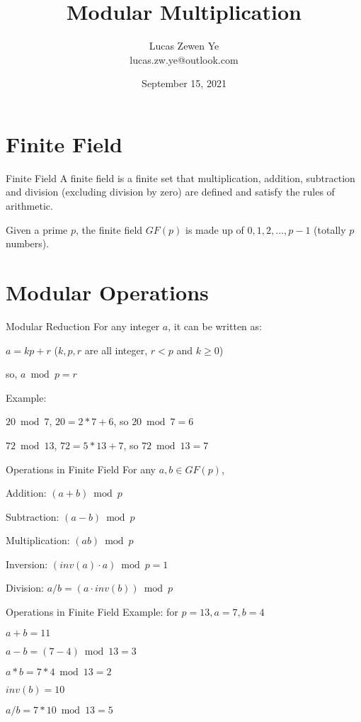 \documentclass{beamer}
\title{Modular Multiplication}
\author{ Lucas Zewen Ye \\ lucas.zw.ye@outlook.com }
\date{September 15, 2021}
\begin{document}
\maketitle

\section{Finite Field}
\begin{frame}{Finite Field}
A finite field is a finite set that multiplication, addition, subtraction and division (excluding division by zero) are defined and satisfy the rules of arithmetic.

Given a \alert{prime} $p$, the finite field $GF(p)$ is made up of $0, 1, 2, ..., p-1$ (totally $p$ numbers).

\end{frame}

\section{Modular Operations}
\begin{frame}{Modular Reduction}
For any integer $a$, it can be written as:

$a = kp + r$ ($k,p,r$ are all integer, $r < p$ and $k \geq 0$)

so, $a \bmod p = r$

\hspace*{\fill}

Example: 

$20 \bmod 7$, $20 = 2 * 7 + 6$, so $20 \bmod 7 = 6$

$72 \bmod 13$, $72 = 5 * 13 + 7$, so $72 \bmod 13 = 7$

\end{frame}

\begin{frame}{Operations in Finite Field}
For any $a, b \in GF(p)$, 

Addition: $(a + b) \bmod p$

Subtraction: $(a - b) \bmod p$

Multiplication: $(a  b) \bmod p$

Inversion: $(inv(a) \cdot a) \bmod p = 1$

Division: $a / b = (a \cdot inv(b)) \bmod p$
\end{frame}

\begin{frame}{Operations in Finite Field}
Example: for $p=13, a=7, b=4$

$a + b = 11$

$a - b = (7 - 4) \bmod 13 = 3$

$a * b = 7 * 4 \bmod 13 = 2$

$inv(b) = 10$

$a / b = 7 * 10 \bmod 13 = 5$
\end{frame}
\end{document}
